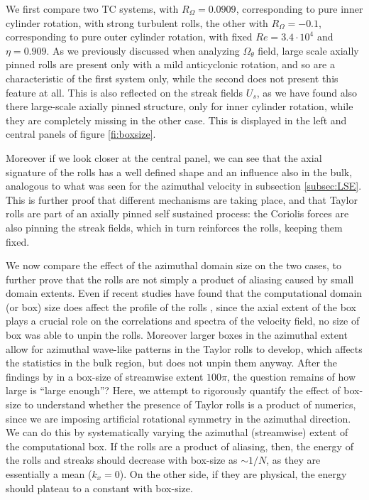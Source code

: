 \documentclass{jfm}
\begin{document}
We first compare two TC systems, with $R_\Omega=0.0909$, corresponding to pure inner cylinder rotation, with strong turbulent rolls, the other with $R_\Omega=-0.1$, corresponding to pure outer cylinder rotation, with fixed $Re=3.4\cdot10^4$ and $\eta=0.909$. As we previously discussed when analyzing $\Omega_{\theta}$ field, large scale axially pinned rolls are present only with a mild anticyclonic rotation, and so are a characteristic of the first system only, while the second does not present this feature at all. This is also reflected on the streak fields $U_s$, as we have found also there large-scale axially pinned structure, only for inner cylinder rotation, while they are completely missing in the other case. This is displayed in the left and central panels of figure \ref{fi:boxsize}. 

Moreover if we look closer at the central panel, we can see that the axial signature of the rolls has a well defined shape and an influence also in the bulk, analogous to what was seen for the azimuthal velocity in subsection \ref{subsec:LSE}. This is further proof that different mechanisms are taking place, and that Taylor rolls are part of an axially pinned self sustained process: the Coriolis forces are also pinning the streak fields, which in turn reinforces the rolls, keeping them fixed. 

We now compare the effect of the azimuthal domain size on the two cases, to further prove that the rolls are not simply a product of aliasing caused by small domain extents. Even if recent studies have found that the computational domain (or box) size does affect the profile of the rolls \citep{ost15,ost16}, since the axial extent of the box plays a crucial role on the correlations and spectra of the velocity field, no size of box was able to unpin the rolls. Moreover larger boxes in the azimuthal extent allow for azimuthal wave-like patterns in the Taylor rolls to develop, which affects the statistics in the bulk region, but does not unpin them anyway. After the findings by \cite{lee18} in a box-size of streamwise extent $100\pi$, the question remains of how large is ``large enough''? Here, we attempt to rigorously quantify the effect of box-size to understand whether the presence of Taylor rolls is a product of numerics, since we are imposing artificial rotational symmetry in the azimuthal direction. We can do this by systematically varying the azimuthal (streamwise) extent of the computational box. If the rolls are a product of aliasing, then, the energy of the rolls and streaks should decrease with box-size as $\sim 1/N$, as they are essentially a mean ($k_x = 0$). On the other side, if they are physical, the energy should plateau to a constant with box-size.
\end{document}
